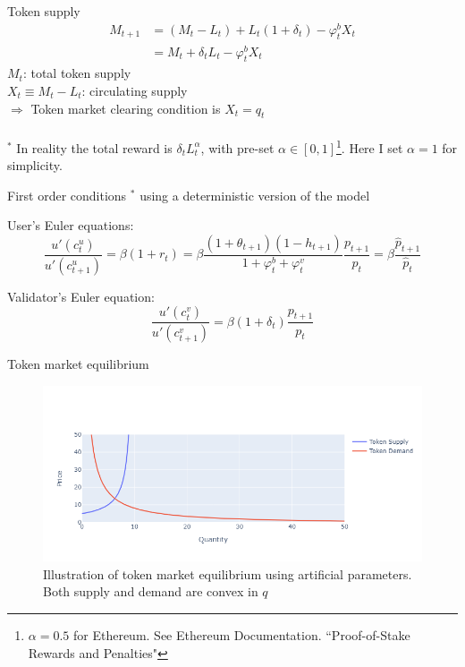 \documentclass{beamer}
\begin{document}
\begin{frame}{Token supply}
    \begin{align}
        M_{t+1} &= (M_t - L_t) + L_t (1 + \delta_t) - \varphi_t^b X_t \nonumber \\
        &= M_t + \delta_t L_t - \varphi_t^b X_t
    \end{align}
    $M_t$: total token supply\\
    $X_t \equiv M_t - L_t$: circulating supply \\
    \quad $\Rightarrow$ Token market clearing condition is $X_t=q_t$\\
    \ \\
    $^*$ In reality the total reward is $\delta_t L_t^\alpha$, with pre-set $\alpha\in [0,1]$\footnote{$\alpha=0.5$ for Ethereum. See Ethereum Documentation. ``Proof-of-Stake Rewards and Penalties"}. Here I set $\alpha=1$ for simplicity.
\end{frame}


\begin{frame}{First order conditions}    
    $^*$ using a deterministic version of the model
    \bigskip

    User's Euler equations:
    \begin{equation}
        \frac{u'(c_t^u)}{u'(c_{t+1}^u)} = \beta (1+r_t) 
        = \beta \frac{(1+\theta_{t+1})(1-h_{t+1})}{1+\varphi_t^b+\varphi_t^v} \frac{p_{t+1}}{p_t}
        = \beta \frac{\hat{p}_{t+1}}{\hat{p}_t}
    \end{equation}

    Validator's Euler equation:
    \begin{equation}
        \frac{u'(c_t^v)}{u'(c_{t+1}^v)} = \beta (1+\delta_t) \frac{p_{t+1}}{p_t}
    \end{equation}

\end{frame}

\begin{frame}{Token market equilibrium}
    \hyperlink{det_math}{}
    \begin{figure}
        \centering
        \includegraphics[width=\textwidth]{../Figures/det_SD.png}
        \caption{Illustration of token market equilibrium using artificial parameters. Both supply and demand are convex in $q$}
    \end{figure}
    
\end{frame}
\end{document}
